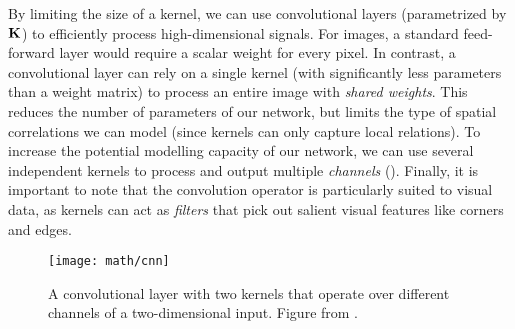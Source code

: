  By limiting the size of a kernel, we can use convolutional layers (parametrized by $\boldsymbol{\mathbf{K}}$) to efficiently process high-dimensional signals. For images, a standard feed-forward layer would require a scalar weight for every pixel. In contrast, a convolutional layer can rely on a single kernel (with significantly less parameters than a weight matrix) to process an entire image with \textit{shared weights}. This reduces the number of parameters of our network, but limits the type of spatial correlations we can model (since kernels can only capture local relations). To increase the potential modelling capacity of our network, we can use several independent kernels to process and output multiple \textit{channels} (). Finally, it is important to note that the convolution operator is particularly suited to visual data, as kernels can act as \textit{filters} that pick out salient visual features like corners and edges.


\begin{figure}[h!]
\begin{center}
		\texttt{[image: math/cnn]}
		\caption{A convolutional layer with two kernels that operate over different channels of a two-dimensional input. Figure from \cite{Gal2016UncertaintyThesis}.}
  	\label{fig:math_cnn}
\end{center}
\end{figure}

